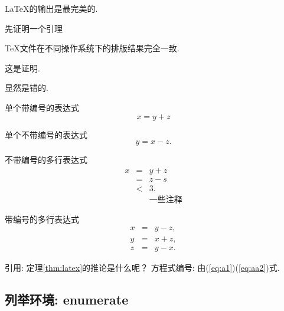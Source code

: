\begin{Theorem} \label{thm:latex}
\LaTeX 的输出是最完美的.
\end{Theorem}

先证明一个引理
\begin{Lemma} \label{thm:tex}
\TeX 文件在不同操作系统下的排版结果完全一致.
\end{Lemma}

\begin{Proof}
这是证明.
\end{Proof}


\begin{Proof}
显然是错的.
\end{Proof}

单个带编号的表达式
\begin{equation}\label{eq:a1}
x=y+z
\end{equation}

单个不带编号的表达式
\[
y=x-z.
\]

不带编号的多行表达式
\begin{eqnarray*}
x&=&y+z \\
 &=&z-s\\
 &<& 3. \\
 && \mbox{一些注释}
\end{eqnarray*}

带编号的多行表达式
\begin{eqnarray}
 x&=& y-z, \label{eq:aa1}\\
 y&=& x+z, \nonumber \\
 z&=&y-x. \label{eq:aa2}
\end{eqnarray}



引用:   定理\ref{thm:latex}的推论是什么呢？
方程式编号:  由(\ref{eq:a1})(\ref{eq:aa2})式.

\subsection{列举环境:  enumerate}

